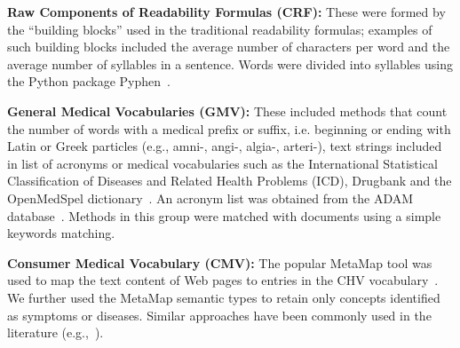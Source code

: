 
\textbf{Raw Components of Readability Formulas (CRF):}
These were formed by the ``building blocks'' used in the traditional readability formulas; examples of such building blocks included the average number of characters per word and the average number of syllables in a sentence. Words were divided into syllables using the Python package Pyphen~\cite{pyphen}.




\textbf{General Medical Vocabularies (GMV):}
These included methods that count the number of words with a medical prefix or suffix, i.e. beginning or ending with Latin or Greek particles (e.g., amni-, angi-, algia-, arteri-), text strings included in list of acronyms or medical vocabularies such as the International Statistical Classification of Diseases and Related Health Problems (ICD), Drugbank and the OpenMedSpel dictionary~\cite{openmedspel}. An acronym list was obtained from the ADAM database~\cite{zhou2006}. Methods in this group were matched with documents using a simple keywords matching.






\textbf{Consumer Medical Vocabulary (CMV):}
The popular MetaMap \cite{aronson10} tool was used to map the text content of Web pages to entries in the CHV vocabulary~\cite{zeng06}.
We further used the MetaMap semantic types to retain only concepts identified as symptoms or diseases. Similar approaches have been commonly used in the literature (e.g.,~\cite{pang16,agrafiotesA16,palotti16}).



